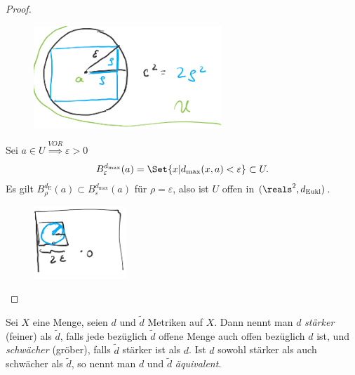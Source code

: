 \begin{beispiel*}
\begin{proof}
        \begin{figure}[H]
            \centering
            \includegraphics[width=0.5\linewidth]{figures/max_quadrat_in_eukl_kreis}
            \label{fig:max_quadrat_in_eukl_kreis}
        \end{figure}
        \item[\rueck] Sei \( a\in U \)\( \overset{VOR}{\implies} \)\texists \( \varepsilon>0 \) \sd
        \begin{align*}
            B_{\varepsilon}^{d_{\max}}(a)=\Set{x|d_{\max}(x,a)<\varepsilon}\subset U.
        \end{align*}
        Es gilt \( B_{\rho}^{d_{\text{E}}}(a)\subset B_{\varepsilon}^{d_{\max}}(a) \) für \( \rho=\varepsilon \), also ist \( U \) offen in \( (\reals^2,d_{\text{Eukl}}) \).
        \begin{figure}[H]
            \centering
            \includegraphics[width=0.4\linewidth]{figures/eukl_kreis_in_max_quadrat}
            \label{fig:eukl_kreis_in_max_quadrat}
        \end{figure}
        
    \end{proof}
    
\end{beispiel*}
\begin{definition}
    Sei \( X \) eine Menge, seien \( d \) und \( \tilde{d} \) Metriken auf \( X \). Dann nennt man \( d \) \emph{stärker} (feiner) als \( \tilde{d} \), falls jede bezüglich \( \tilde{d} \) offene Menge auch offen bezüglich \( d \) ist, und \emph{schwächer} (gröber), falls \( \tilde{d} \) stärker ist als \( d \). Ist \( d \) sowohl stärker als auch schwächer als \( \tilde{d} \), so nennt man \( d \) und \( \tilde{d} \) \emph{äquivalent}.
\end{definition}

